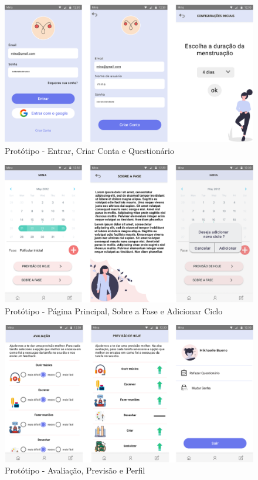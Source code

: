 \begin{figure}[ht]
    \centering
    \includegraphics[keepaspectratio=true,scale=0.3]{figuras/prototipo1-v.png}
    \caption{Protótipo - Entrar, Criar Conta e Questionário}
        \label{fig09}
\end{figure}

\begin{figure}[ht] 
    \centering
    \includegraphics[keepaspectratio=true,scale=0.3]{figuras/prototipo2-v.png}
    \caption{Protótipo - Página Principal, Sobre a Fase e Adicionar Ciclo}
        \label{fig10}
\end{figure}

\begin{figure}[ht]
    \centering
    \includegraphics[keepaspectratio=true,scale=0.3]{figuras/prototipo3-v.png}
    \caption{Protótipo - Avaliação, Previsão e Perfil}
        \label{fig11}
\end{figure}

